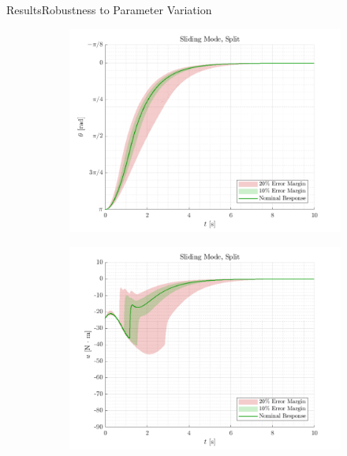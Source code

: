 \begin{frame}{Results}{Robustness to Parameter Variation}
\begin{figure}[H]
  \begin{minipage}{0.45\linewidth}
    \begin{figure}[H]
      \centering
      \includegraphics[width=\linewidth]{figures/slidingModeSplit}
    \end{figure}        
  \end{minipage}\hfill      
  \begin{minipage}{0.45\linewidth}
    \begin{figure}[H]
      \centering
      \includegraphics[width=1\linewidth]{figures/slidingModeSplit_u}
    \end{figure}                
  \end{minipage}\hfill \\
\end{figure}
\end{frame}

